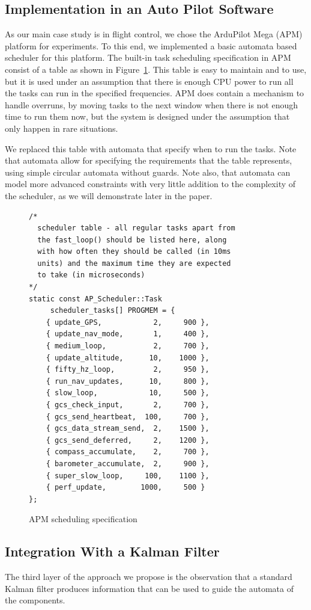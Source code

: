 \documentclass{sig-alternate-ipsn13}
\begin{document}
\subsection{Implementation in an Auto Pilot Software}
As our main case study is in flight control, we chose the ArduPilot Mega
(APM) platform for experiments. To this end, we implemented a basic automata based scheduler for this platform. The built-in task scheduling specification in APM consist of a table as shown in Figure~\ref{fig:apm-scheduler}. This table is easy to maintain and to use, but it is used under an assumption that there is enough CPU power to run all the tasks can run in the specified frequencies. APM does contain a mechanism to handle overruns, by moving tasks to the next window when there is not enough time to run them now, but the system is designed under the assumption that only happen in rare situations.

We replaced this table with automata that specify when to run the tasks. Note that automata allow for specifying the requirements that the table represents, using simple circular automata without guards. Note also, that automata can model more advanced constraints with very little addition to the complexity of the scheduler, as we will demonstrate later in the paper. 

\begin{figure}
	\scriptsize
	\begin{lstlisting}
/*
  scheduler table - all regular tasks apart from
  the fast_loop() should be listed here, along 
  with how often they should be called (in 10ms 
  units) and the maximum time they are expected 
  to take (in microseconds)
*/
static const AP_Scheduler::Task 
     scheduler_tasks[] PROGMEM = {
	{ update_GPS,            2,     900 },
	{ update_nav_mode,       1,     400 },
	{ medium_loop,           2,     700 },
	{ update_altitude,      10,    1000 },
	{ fifty_hz_loop,         2,     950 },
	{ run_nav_updates,      10,     800 },
	{ slow_loop,            10,     500 },
	{ gcs_check_input,       2,     700 },
	{ gcs_send_heartbeat,  100,     700 },
	{ gcs_data_stream_send,  2,    1500 },
	{ gcs_send_deferred,     2,    1200 },
	{ compass_accumulate,    2,     700 },
	{ barometer_accumulate,  2,     900 },
	{ super_slow_loop,     100,    1100 },
	{ perf_update,        1000,     500 }
};
	\end{lstlisting}
	\caption{APM scheduling specification}
	\label{fig:apm-scheduler} 
\end{figure}


\subsection{Integration With a Kalman Filter}
The third layer of the approach we propose is the observation that a standard Kalman filter produces information that can be used to guide the automata of the components. 
\end{document}
